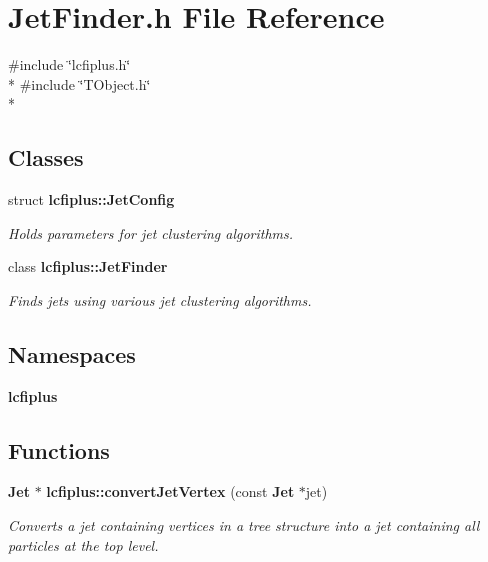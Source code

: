 \section{Jet\-Finder.\-h File Reference}
\label{JetFinder_8h}
{\ttfamily \#include \char`\"{}lcfiplus.\-h\char`\"{}}\\*
{\ttfamily \#include \char`\"{}T\-Object.\-h\char`\"{}}\\*
\subsection*{Classes}
\begin{DoxyCompactItemize}
\item 
struct {\bf lcfiplus\-::\-Jet\-Config}
\begin{DoxyCompactList}\small\item\em Holds parameters for jet clustering algorithms. \end{DoxyCompactList}\item 
class {\bf lcfiplus\-::\-Jet\-Finder}
\begin{DoxyCompactList}\small\item\em Finds jets using various jet clustering algorithms. \end{DoxyCompactList}\end{DoxyCompactItemize}
\subsection*{Namespaces}
\begin{DoxyCompactItemize}
\item 
{\bf lcfiplus}
\end{DoxyCompactItemize}
\subsection*{Functions}
\begin{DoxyCompactItemize}
\item 
{\bf Jet} $\ast$ {\bf lcfiplus\-::convert\-Jet\-Vertex} (const {\bf Jet} $\ast$jet)
\begin{DoxyCompactList}\small\item\em Converts a jet containing vertices in a tree structure into a jet containing all particles at the top level. \end{DoxyCompactList}\end{DoxyCompactItemize}
